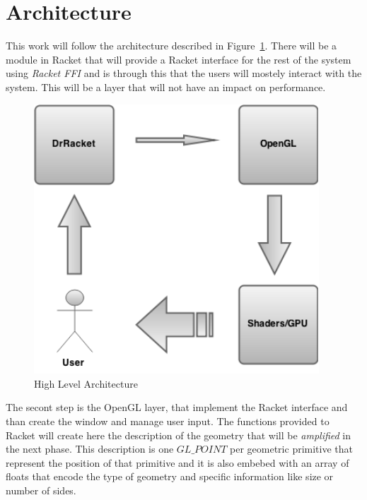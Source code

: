 
%
%

\section{Architecture} %
\label{sec:architecture}

This work will follow the architecture described in Figure~\ref{fig:architecture}.
There will be a module in Racket that will provide a Racket interface for the rest of the system using \emph{Racket FFI} and is through this that the users will mostely interact with the system. This will be a layer that will not have an impact on performance. 

\begin{figure}[htbp]
	\centering
	\includegraphics[width=0.95\textwidth]{img/Architecture/architecture1.png}
	\caption{High Level Architecture}
	\label{fig:architecture}
\end{figure}

The secont step is the OpenGL layer, that implement the Racket interface and than create the window and manage user input. The functions provided to Racket will create here the description of the geometry that will be \emph{amplified} in the next phase. This description is one $GL\_POINT$ per geometric primitive that represent the position of that primitive and it is also embebed with an array of floats that encode the type of geometry and specific information like size or number of sides.

